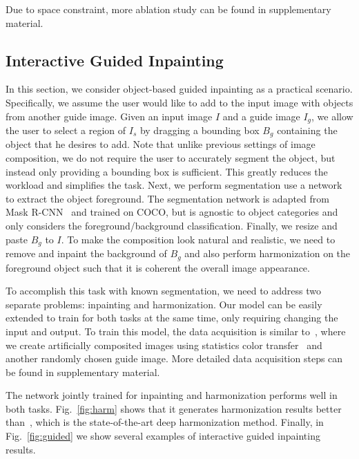 Due to space constraint, more ablation study can be found in supplementary material.

\subsection{Interactive Guided Inpainting}
\label{exp:guided} 

In this section, we consider object-based guided inpainting as a practical scenario. Specifically, we assume the user would like to add to the input image with objects from another guide image. Given an input image $I$ and a guide image $I_g$, we allow the user to select a region of $I_s$ by dragging a bounding box $B_g$ containing the object that he desires to add. Note that unlike previous settings of image composition, we do not require the user to accurately segment the object, but instead only providing a bounding box is sufficient. This greatly reduces the workload and simplifies the task. Next, we perform segmentation use a network to extract the object foreground. The segmentation network is adapted from Mask R-CNN~\cite{he2017mask} and trained on COCO, but is agnostic to object categories and only considers the foreground/background classification. Finally, we resize and paste $B_g$ to $I$. To make the composition look natural and realistic, we need to remove and inpaint the background of $B_g$ and also perform harmonization on the foreground object such that it is coherent the overall image appearance.   

To accomplish this task with known segmentation, we need to address two separate problems: inpainting and harmonization. Our model can be easily extended to train for both tasks at the same time, only requiring changing the input and output. To train this model, the data acquisition is similar to~\cite{tsai2017deep}, where we create artificially composited images using statistics color transfer~\cite{reinhard2001color} and another randomly chosen guide image. More detailed data acquisition steps can be found in supplementary material.

The network jointly trained for inpainting and harmonization performs well in both tasks. Fig.~\ref{fig:harm} shows that it generates harmonization results better than~\cite{tsai2017deep}, which is the state-of-the-art deep harmonization method. Finally, in Fig.~\ref{fig:guided} we show several examples of interactive guided inpainting results.

